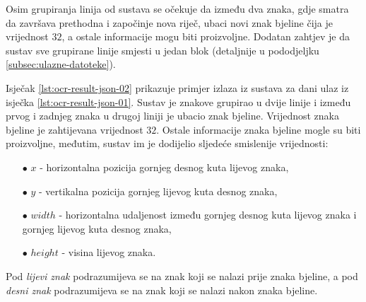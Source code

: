 \documentclass[times, utf8, zavrsni]{fer}
\begin{document}
Osim grupiranja linija od sustava se očekuje da između dva znaka, gdje smatra da
završava prethodna i započinje nova riječ, ubaci novi znak bjeline čija je
vrijednost  $32$, a ostale informacije mogu biti proizvoljne.
Dodatan zahtjev je da sustav sve grupirane linije smjesti u jedan blok
(detaljnije u pododjeljku \ref{subsec:ulazne-datoteke}).

Isječak \ref{lst:ocr-result-json-02} prikazuje primjer izlaza iz sustava za dani
ulaz iz isječka \ref{lst:ocr-result-json-01}. Sustav je znakove grupirao u dvije
linije i između prvog i zadnjeg znaka u drugoj liniji je ubacio znak bjeline.
Vrijednost znaka bjeline je zahtijevana vrijednost $32$. Ostale informacije
znaka bjeline mogle su biti proizvoljne, međutim, sustav im je dodijelio
sljedeće smislenije vrijednosti:\begin{itemize}
    \item[$\bullet$] $x$ - horizontalna pozicija gornjeg desnog kuta lijevog
                           znaka,
    \item[$\bullet$] $y$ - vertikalna pozicija gornjeg lijevog kuta desnog
                           znaka,
    \item[$\bullet$] $width$ - horizontalna udaljenost između gornjeg desnog
                               kuta lijevog znaka i gornjeg lijevog kuta desnog
                               znaka,
    \item[$\bullet$] $height$ - visina lijevog znaka.
\end{itemize}

Pod \emph{lijevi znak} podrazumijeva se na znak koji se nalazi prije znaka
bjeline, a pod \emph{desni znak} podrazumijeva se na znak koji se nalazi nakon
znaka bjeline.

\pagebreak
\end{document}
